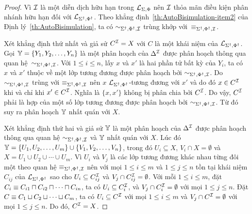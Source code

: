 \begin{proof}
Vì $\mathcal{I}$ là một diễn dịch hữu hạn trong $\mathcal{L}_{\Sigma,\Phi}$ nên $\mathcal{I}$ thỏa mãn điều kiện phân nhánh hữu hạn đối với $\mathcal{L}_{\Sigma^\dag,\Phi^\dag}$. Theo khẳng định~\eqref{th:AutoBisimulation-item2} của Định lý~\ref{th:AutoBisimulation}, ta có $\sim_{\Sigma^\dag,\Phi^\dag,\mathcal{I}}$ trùng khớp với~$\equiv_{\Sigma^\dag,\Phi^\dag,\mathcal{I}}$.

\semiItem Xét khẳng định thứ nhất và giả sử $C^{\mathcal{I}} = X$ với $C$ là một khái niệm của $\mathcal{L}_{\Sigma^\dag,\Phi^\dag}$. Gọi $\mathbb{Y} = \{Y_1, Y_2, \ldots, Y_n\}$ là một phân hoạch của $\Delta^{\mathcal{I}}$ được phân hoạch thông qua quan hệ~$\sim_{\Sigma^\dag,\Phi^\dag,\mathcal{I}}$. Với $1 \leq i \leq n$, lấy $x$ và $x'$ là hai phần tử bất kỳ của $Y_i$, ta có $x$ và $x'$ thuộc về một lớp tương đương được phân hoạch bởi $\sim_{\Sigma^\dag,\Phi^\dag,\mathcal{I}}$. Do $\sim_{\Sigma^\dag,\Phi^\dag,\mathcal{I}}$ trùng với $\equiv_{\Sigma^\dag,\Phi^\dag,\mathcal{I}}$ nên $x$ $\mathcal{L}_{\Sigma^\dag,\Phi^\dag}$-tương đương với $x'$ và do đó $x \in C^{\mathcal{I}}$ khi và chỉ khi $x' \in C^{\mathcal{I}}$. Nghĩa là $\{x, x'\}$ không bị phân chia bởi $C^{\mathcal{I}}$. Do vậy, $C^{\mathcal{I}}$ phải là hợp của một số lớp tương đương được phân hoạch bởi $\sim_{\Sigma^\dag,\Phi^\dag,\mathcal{I}}$. Từ đó suy ra phân hoạch $\mathbb{Y}$ nhất quán với $X$.

\semiItem Xét khẳng định thứ hai và giả sử $\mathbb{Y}$ là một phân hoạch của $\Delta^{\mathcal{I}}$ được phân hoạch thông qua quan hệ $\sim_{\Sigma^\dag,\Phi^\dag,\mathcal{I}}$ và $\mathbb{Y}$ nhất quán với $X$. Lúc đó $\mathbb{Y} = \{U_1, U_2, \ldots, U_m\} \cup \{V_1, V_2, \ldots, V_{n}\}$, trong đó $U_i \subseteq X$, $V_i \cap X = \emptyset$ và $X = U_1 \cup U_2 \cup \cdots \cup U_{m}$. Vì $U_i$ và $V_j$ là các lớp tương đương khác nhau từng đôi một theo quan hệ $\equiv_{\Sigma^\dag,\Phi^\dag,\mathcal{I}}$ nên với mọi $1 \leq i \leq m$ và $1 \leq j \leq n$ tồn tại khái niệm $C_{ij}$ của $\mathcal{L}_{\Sigma^\dag,\Phi^\dag}$ sao cho $U_i \subseteq C_{ij}^{\mathcal{I}}$ và $V_j \cap C_{ij}^{\mathcal{I}} = \emptyset$. Với mỗi $1 \leq i \leq m$, đặt $C_i \equiv C_{i1} \sqcap C_{i2} \sqcap \cdots \sqcap C_{in}$, ta có $U_i \subseteq C_i^{\mathcal{I}}$, và $V_j \cap C_i^{\mathcal{I}} = \emptyset$ với mọi $1 \leq j \leq n$. Đặt $C \equiv C_1 \sqcup C_2 \sqcup \cdots \sqcup C_m$, ta có $U_i \subseteq C^{\mathcal{I}}$ với mọi $1 \leq i \leq m$ và $V_j \cap C^{\mathcal{I}} = \emptyset$ với mọi $1 \leq j \leq n$. Do đó, $C^{\mathcal{I}} = X$.
\end{proof}

